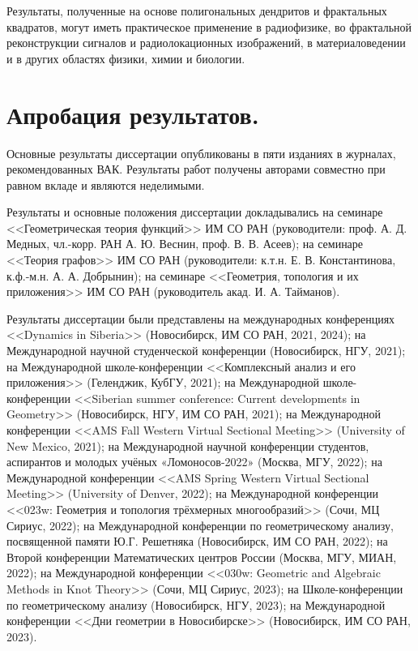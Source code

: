 \documentclass[a5paper,9pt,twoside]{extarticle} %
\begin{document}
Результаты, полученные на основе полигональных дендритов и фрактальных квадратов, могут иметь практическое применение в радиофизике, во фрактальной реконструкции сигналов и радиолокационных изображений, в материаловедении и в других областях физики, химии и биологии.


\section{Апробация результатов.}

Основные результаты диссертации опубликованы в пяти изданиях \cite{DST2021, DST2022, TD2022fs, TD2023fs, VDT2020} в журналах, рекомендованных ВАК.
Результаты работ \cite{DST2021, DST2022, TD2022fs, TD2023fs, VDT2020} получены авторами совместно при равном вкладе и являются неделимыми.

Результаты и основные положения диссертации докладывались на семинаре <<Геометрическая теория функций>> ИМ СО РАН (руководители:
проф. А. Д. Медных, чл.-корр. РАН А. Ю. Веснин, проф. В. В. Асеев); на семинаре <<Теория графов>> ИМ СО РАН (руководители: к.т.н. Е. В. Константинова, к.ф.-м.н. А. А. Добрынин); на семинаре <<Геометрия, топология и их приложения>> ИМ СО РАН (руководитель акад. И. А. Тайманов).

Результаты диссертации были представлены на международных конференциях <<Dynamics in Siberia>> (Новосибирск, ИМ СО РАН, 2021, 2024); 
на Международной научной студенческой конференции (Новосибирск, НГУ, 2021);
на Международной школе-конференции <<Комплексный анализ и его приложения>> (Геленджик, КубГУ, 2021); 
на Международной школе-конференции <<Siberian summer conference: Current developments in Geometry>> (Новосибирск, НГУ, ИМ СО РАН, 2021); 
на Международной конференции <<AMS Fall Western Virtual Sectional Meeting>> (University of New Mexico, 2021); 
на Международной научной конференции студентов, аспирантов и молодых учёных «Ломоносов-2022» (Москва, МГУ, 2022); 
на Международной конференции <<AMS Spring Western Virtual Sectional Meeting>> (University of Denver, 2022); 
на Международной конференции <<023w: Геометрия и топология трёхмерных многообразий>> (Сочи, МЦ Сириус, 2022); 
на Международной конференции по геометрическому анализу, посвященной памяти Ю.Г. Решетняка (Новосибирск, ИМ СО РАН, 2022); 
на Второй конференции Математических центров России (Москва, МГУ, МИАН, 2022); 
на Международной конференции <<030w: Geometric and Algebraic Methods in Knot Theory>> (Сочи, МЦ Сириус, 2023);
на Школе-конференции по геометрическому анализу
(Новосибирск, НГУ, 2023);
на Международной конференции <<Дни геометрии в Новосибирске>> (Новосибирск, ИМ СО РАН, 2023).
\end{document}
